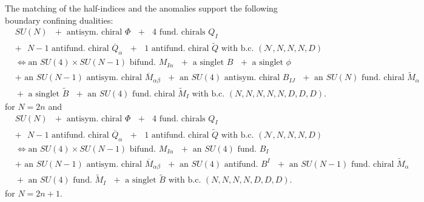 \documentclass[12pt]{article}
\numberwithin{equation}{section}
\begin{document}
The matching of the half-indices and the anomalies support the following boundary confining dualities: 
\begin{align}
\label{bdy_SUN_AS_4_Nm1_dual1}
&\textrm{$SU(N)$ $+$ antisym. chiral $\Phi$ $+$ $4$ fund. chirals $Q_{I}$}
\nonumber\\
&\textrm{$+$ $N-1$ antifund. chiral $\overline{Q}_{\alpha}$ $+$ $1$ antifund. chiral $\widetilde{Q}$ with b.c. $(\mathcal{N},N,N,N,D)$}
\nonumber\\
&\Leftrightarrow 
\textrm{
an $SU(4)\times SU(N-1)$ bifund. $M_{I \alpha}$ $+$ a singlet $B$ $+$ a singlet $\phi$}
\nonumber\\
&\textrm{$+$ an $SU(N-1)$ antisym. chiral $\overline{M}_{\alpha\beta}$ $+$ an $SU(4)$ antisym. chiral $B_{IJ}$ 
$+$ an $SU(N)$ fund. chiral $\widetilde{M}_{\alpha}$}
\nonumber\\
&\textrm{
$+$ a singlet $\widetilde{B}$ $+$ an $SU(4)$ fund. chiral $\widetilde{M}_I$ with b.c. $(N,N,N,N,N,D,D,D)$}. 
\end{align}
for $N=2n$ and
%
\begin{align}
\label{bdy_SUN_AS_4_Nm1_dual2}
&\textrm{$SU(N)$ $+$ antisym. chiral $\Phi$ $+$ $4$ fund. chirals $Q_{I}$}
\nonumber\\
&\textrm{$+$ $N-1$ antifund. chiral $\overline{Q}_{\alpha}$ $+$ $1$ antifund. chiral $\widetilde{Q}$ with b.c. $(\mathcal{N},N,N,N,D)$}
\nonumber\\
&\Leftrightarrow 
\textrm{
an $SU(4)\times SU(N-1)$ bifund. $M_{I \alpha}$ $+$ an $SU(4)$ fund. $B_I$}
\nonumber\\
&\textrm{$+$ an $SU(N-1)$ antisym. chiral $\overline{M}_{\alpha\beta}$ $+$ an $SU(4)$ antifund. $B^I$ 
$+$ an $SU(N-1)$ fund. chiral $\widetilde{M}_{\alpha}$}
\nonumber\\
&\textrm{
$+$ an $SU(4)$ fund. $\widetilde{M}_I$ $+$ a singlet $\widetilde{B}$ with b.c. $(N,N,N,N,D,D,D)$}. 
\end{align}
for $N=2n+1$. 
\end{document}
